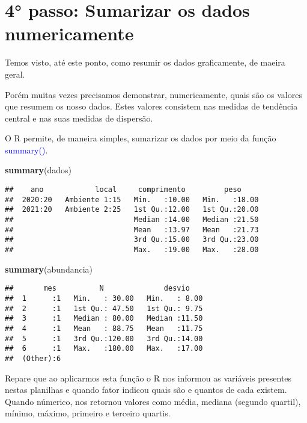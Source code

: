 \documentclass[14pt,titlepage, oneside, openany, a4paper]{book}
\newenvironment{Shaded}{\begin{snugshade}}{\end{snugshade}}
\newcommand{\KeywordTok}[1]{\textcolor[rgb]{0.13,0.29,0.53}{\textbf{#1}}}
\newcommand{\NormalTok}[1]{#1}
\begin{document}
\hypertarget{passo-sumarizar-os-dados-numericamente}{%
\section{4° passo: Sumarizar os dados numericamente}\label{passo-sumarizar-os-dados-numericamente}}

Temos visto, até este ponto, como resumir os dados graficamente, de maeira geral.

Porém muitas vezes precisamos demonstrar, numericamente, quais são os valores que resumem os nosso dados. Estes valores consistem nas medidas de tendência central e nas suas medidas de dispersão.

O R permite, de maneira simples, sumarizar os dados por meio da função \textcolor{blue}{summary()}.

\begin{Shaded}
\begin{Highlighting}[]
\KeywordTok{summary}\NormalTok{(dados)}
\end{Highlighting}
\end{Shaded}

\begin{verbatim}
##    ano            local     comprimento         peso      
##  2020:20   Ambiente 1:15   Min.   :10.00   Min.   :18.00  
##  2021:20   Ambiente 2:25   1st Qu.:12.00   1st Qu.:20.00  
##                            Median :14.00   Median :21.50  
##                            Mean   :13.97   Mean   :21.73  
##                            3rd Qu.:15.00   3rd Qu.:23.00  
##                            Max.   :19.00   Max.   :28.00
\end{verbatim}

\begin{Shaded}
\begin{Highlighting}[]
\KeywordTok{summary}\NormalTok{(abundancia)}
\end{Highlighting}
\end{Shaded}

\begin{verbatim}
##       mes          N              desvio     
##  1      :1   Min.   : 30.00   Min.   : 8.00  
##  2      :1   1st Qu.: 47.50   1st Qu.: 9.75  
##  3      :1   Median : 80.00   Median :11.50  
##  4      :1   Mean   : 88.75   Mean   :11.75  
##  5      :1   3rd Qu.:120.00   3rd Qu.:14.00  
##  6      :1   Max.   :180.00   Max.   :17.00  
##  (Other):6
\end{verbatim}

Repare que ao aplicarmos esta função o R nos informou as variáveis presentes nestas planilhas e quando fator indicou quais são e quantos de cada existem. Quando númerico, nos retornou valores como média, mediana (segundo quartil), mínimo, máximo, primeiro e terceiro quartis.
\end{document}
